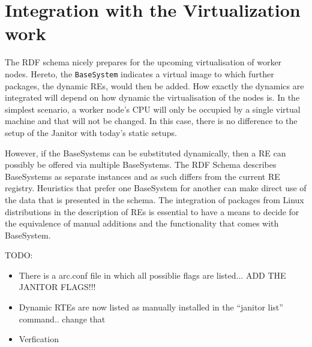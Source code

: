 \section{Integration with the Virtualization work}

The RDF schema nicely prepares for the upcoming virtualisation of worker
nodes. Hereto, the {\tt BaseSystem} indicates a virtual image to which
further packages, the dynamic REs, would then be added.
How exactly the dynamics are integrated will depend on how
dynamic the virtualisation of the nodes is. In the simplest scenario,
a worker node's CPU will only be occupied by a single virtual machine
and that will not be changed. In this case, there is no difference to
the setup of the Janitor with today's static setups.

However, if the BaseSystems can be substituted dynamically, then a RE
can possibly be offered via multiple BaseSystems. The RDF
Schema describes BaseSystems as separate instances and as such differs
from the current RE registry.  Heuristics that prefer one BaseSystem for
another can make direct use of the data that is presented in the schema.
The integration of packages from Linux distributions in the description
of REs is essential to have a means to decide for the equivalence of
manual additions and the functionality that comes with BaseSystem.


TODO:\\
\begin{itemize}
 \item There is a arc.conf file in which all possiblie flags are listed... ADD THE JANITOR FLAGS!!!
 \item Dynamic RTEs are now listed as manually installed in the ``janitor list'' command.. change that
 \item Verfication
\end{itemize}






